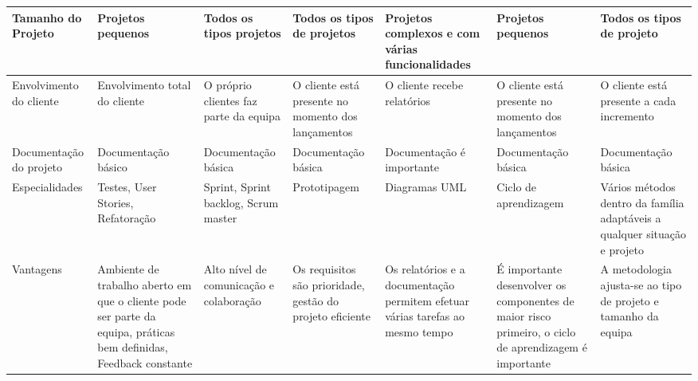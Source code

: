 \begin{table}
{\begin{tabular}{|l|l|l|l|l|l|l|}
Tamanho do Projeto             & Projetos pequenos                                                                                                 & Todos os tipos projetos                                             & Todos os tipos de projetos                                & Projetos complexos e com várias funcionalidades                               & Projetos pequenos                                                                                     & Todos os tipos de projeto                                                 \\ \hline
Envolvimento do cliente        & Envolvimento total do cliente                                                                                     & O próprio clientes faz parte da equipa                              & O cliente está presente no momento dos lançamentos        & O cliente recebe relatórios                                                   & O cliente está presente no momento dos lançamentos                                                    & O cliente está presente a cada incremento                                 \\ \hline
Documentação do projeto        & Documentação básico                                                                                               & Documentação básica                                                 & Documentação básica                                       & Documentação é importante                                                     & Documentação básica                                                                                   & Documentação básica                                                       \\ \hline
Especialidades                 & Testes, User Stories, Refatoração                                                                                 & Sprint, Sprint backlog, Scrum master                                & Prototipagem                                              & Diagramas UML                                                                 & Ciclo de aprendizagem                                                                                 & Vários métodos dentro da família adaptáveis a qualquer situação e projeto \\ \hline
Vantagens                      & Ambiente de trabalho aberto em que o cliente pode ser parte da equipa, práticas bem definidas, Feedback constante & Alto nível de comunicação e colaboração                             & Os requisitos são prioridade, gestão do projeto eficiente & Os relatórios e a documentação permitem efetuar várias tarefas ao mesmo tempo & É importante desenvolver os componentes de maior risco primeiro, o ciclo de aprendizagem é importante & A metodologia ajusta-se ao tipo de projeto e tamanho da equipa            \\ \hline

\end{tabular}}
\end{table}
